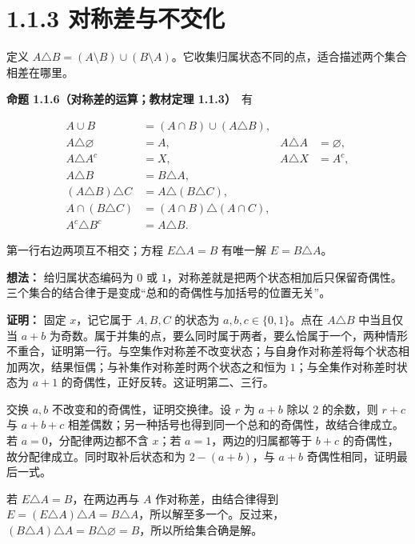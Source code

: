 \documentclass[11pt,a4paper]{article}
\begin{document}
\section[\S{}1.1.3
对称差与不交化]{1.1.3
对称差与不交化}\label{ux5bf9ux79f0ux5deeux4e0eux4e0dux4ea4ux5316}

定义
\(A\triangle B=(A\setminus B)\cup(B\setminus A)\)。它收集归属状态不同的点，适合描述两个集合相差在哪里。

\textbf{命题 1.1.6（对称差的运算；教材定理 1.1.3）}　有

\begin{equation*}
\begin{aligned}
A\cup B&=(A\cap B)\cup(A\triangle B),\\
A\triangle\varnothing&=A,&A\triangle A&=\varnothing,\\
A\triangle A^c&=X,&A\triangle X&=A^c,\\
A\triangle B&=B\triangle A,\\
(A\triangle B)\triangle C&=A\triangle(B\triangle C),\\
A\cap(B\triangle C)&=(A\cap B)\triangle(A\cap C),\\
A^c\triangle B^c&=A\triangle B.
\end{aligned}\tag{1.1.8}
\end{equation*}

第一行右边两项互不相交；方程 \(E\triangle A=B\) 有唯一解
\(E=B\triangle A\)。

\textbf{想法：} 给归属状态编码为 \(0\) 或
\(1\)，对称差就是把两个状态相加后只保留奇偶性。三个集合的结合律于是变成``总和的奇偶性与加括号的位置无关''。

\textbf{证明：} 固定 \(x\)，记它属于 \(A,B,C\) 的状态为
\(a,b,c\in\{0,1\}\)。点在 \(A\triangle B\) 中当且仅当 \(a+b\)
为奇数。属于并集的点，要么同时属于两者，要么恰属于一个，两种情形不重合，证明第一行。与空集作对称差不改变状态；与自身作对称差将每个状态相加两次，结果恒偶；与补集作对称差时两个状态之和恒为
\(1\)；与全集作对称差时状态为 \(a+1\)
的奇偶性，正好反转。这证明第二、三行。

交换 \(a,b\) 不改变和的奇偶性，证明交换律。设 \(r\) 为 \(a+b\) 除以
\(2\) 的余数，则 \(r+c\) 与 \(a+b+c\)
相差偶数；另一种括号也得到同一个总和的奇偶性，故结合律成立。若
\(a=0\)，分配律两边都不含 \(x\)；若 \(a=1\)，两边的归属都等于 \(b+c\)
的奇偶性，故分配律成立。同时取补后状态和为 \(2-(a+b)\)，与 \(a+b\)
奇偶性相同，证明最后一式。

若 \(E\triangle A=B\)，在两边再与 \(A\) 作对称差，由结合律得到
\(E=(E\triangle A)\triangle A=B\triangle A\)，所以解至多一个。反过来，\((B\triangle A)\triangle A=B\triangle\varnothing=B\)，所以所给集合确是解。
\end{document}
